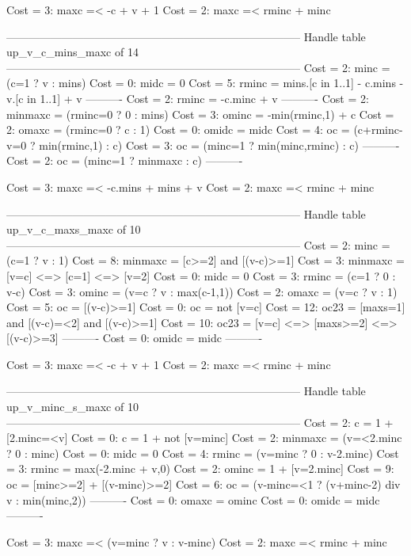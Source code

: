 Cost =  3:  maxc =< -c + v + 1
Cost =  2:  maxc =< rminc + minc

--------------------------------------------------------------------------------
Handle table up_v_c_mins_maxc of 14
--------------------------------------------------------------------------------
Cost =  2:  minc    = (c=1 ? v : mins)
Cost =  0:  midc    = 0
Cost =  5:  rminc   = mins.[c in 1..1] - c.mins - v.[c in 1..1] + v
----------
Cost =  2:  rminc   = -c.minc + v
----------
Cost =  2:  minmaxc = (rminc=0 ? 0 : mins)
Cost =  3:  ominc   = -min(rminc,1) + c
Cost =  2:  omaxc   = (rminc=0 ? c : 1)
Cost =  0:  omidc   = midc
Cost =  4:  oc      = (c+rminc-v=0 ? min(rminc,1) : c)
Cost =  3:  oc      = (minc=1 ? min(minc,rminc) : c)
----------
Cost =  2:  oc      = (minc=1 ? minmaxc : c)
----------

Cost =  3:  maxc =< -c.mins + mins + v
Cost =  2:  maxc =< rminc + minc

--------------------------------------------------------------------------------
Handle table up_v_c_maxs_maxc of 10
--------------------------------------------------------------------------------
Cost =  2:  minc    = (c=1 ? v : 1)
Cost =  8:  minmaxc = [c>=2] and [(v-c)>=1]
Cost =  3:  minmaxc = [v=c] <=> [c=1] <=> [v=2]
Cost =  0:  midc    = 0
Cost =  3:  rminc   = (c=1 ? 0 : v-c)
Cost =  3:  ominc   = (v=c ? v : max(c-1,1))
Cost =  2:  omaxc   = (v=c ? v : 1)
Cost =  5:  oc      = [(v-c)>=1]
Cost =  0:  oc      = not [v=c]
Cost = 12:  oc23    = [maxs=1] and [(v-c)=<2] and [(v-c)>=1]
Cost = 10:  oc23    = [v=c] <=> [maxs>=2] <=> [(v-c)>=3]
----------
Cost =  0:  omidc   = midc
----------

Cost =  3:  maxc =< -c + v + 1
Cost =  2:  maxc =< rminc + minc

--------------------------------------------------------------------------------
Handle table up_v_minc_s_maxc of 10
--------------------------------------------------------------------------------
Cost =  2:  c       = 1 + [2.minc=<v]
Cost =  0:  c       = 1 + not [v=minc]
Cost =  2:  minmaxc = (v=<2.minc ? 0 : minc)
Cost =  0:  midc    = 0
Cost =  4:  rminc   = (v=minc ? 0 : v-2.minc)
Cost =  3:  rminc   = max(-2.minc + v,0)
Cost =  2:  ominc   = 1 + [v=2.minc]
Cost =  9:  oc      = [minc>=2] + [(v-minc)>=2]
Cost =  6:  oc      = (v-minc=<1 ? (v+minc-2) div v : min(minc,2))
----------
Cost =  0:  omaxc   = ominc
Cost =  0:  omidc   = midc
----------

Cost =  3:  maxc =< (v=minc ? v : v-minc)
Cost =  2:  maxc =< rminc + minc

